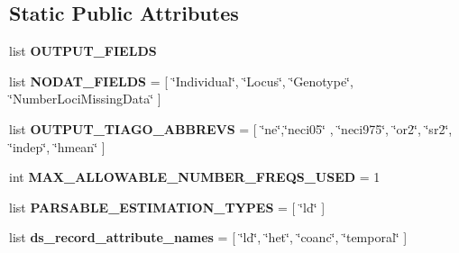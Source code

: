 \subsection*{Static Public Attributes}
\begin{DoxyCompactItemize}
\item 
list {\bfseries O\+U\+T\+P\+U\+T\+\_\+\+F\+I\+E\+L\+DS}
\item 
list {\bfseries N\+O\+D\+A\+T\+\_\+\+F\+I\+E\+L\+DS} = \mbox{[} \char`\"{}Individual\char`\"{}, \char`\"{}Locus\char`\"{}, \char`\"{}Genotype\char`\"{}, \char`\"{}Number\+Loci\+Missing\+Data\char`\"{} \mbox{]}\hypertarget{classnegui_1_1pgoutputneestimator_1_1PGOutputNeEstimator_a4e5c6c9926a8f963e36d83d858366c4d}{}\label{classnegui_1_1pgoutputneestimator_1_1PGOutputNeEstimator_a4e5c6c9926a8f963e36d83d858366c4d}

\item 
list {\bfseries O\+U\+T\+P\+U\+T\+\_\+\+T\+I\+A\+G\+O\+\_\+\+A\+B\+B\+R\+E\+VS} = \mbox{[} \char`\"{}ne\char`\"{},\char`\"{}neci05\char`\"{} , \char`\"{}neci975\char`\"{}, \char`\"{}or2\char`\"{}, \char`\"{}sr2\char`\"{}, \char`\"{}indep\char`\"{}, \char`\"{}hmean\char`\"{} \mbox{]}\hypertarget{classnegui_1_1pgoutputneestimator_1_1PGOutputNeEstimator_a916a47666e6360ea279b944832907b27}{}\label{classnegui_1_1pgoutputneestimator_1_1PGOutputNeEstimator_a916a47666e6360ea279b944832907b27}

\item 
int {\bfseries M\+A\+X\+\_\+\+A\+L\+L\+O\+W\+A\+B\+L\+E\+\_\+\+N\+U\+M\+B\+E\+R\+\_\+\+F\+R\+E\+Q\+S\+\_\+\+U\+S\+ED} = 1\hypertarget{classnegui_1_1pgoutputneestimator_1_1PGOutputNeEstimator_ab5bcb8ce89a3453910014169865706d2}{}\label{classnegui_1_1pgoutputneestimator_1_1PGOutputNeEstimator_ab5bcb8ce89a3453910014169865706d2}

\item 
list {\bfseries P\+A\+R\+S\+A\+B\+L\+E\+\_\+\+E\+S\+T\+I\+M\+A\+T\+I\+O\+N\+\_\+\+T\+Y\+P\+ES} = \mbox{[} \char`\"{}ld\char`\"{} \mbox{]}\hypertarget{classnegui_1_1pgoutputneestimator_1_1PGOutputNeEstimator_a004e7b99039d5176bff002232337d4e3}{}\label{classnegui_1_1pgoutputneestimator_1_1PGOutputNeEstimator_a004e7b99039d5176bff002232337d4e3}

\item 
list {\bfseries ds\+\_\+record\+\_\+attribute\+\_\+names} = \mbox{[} \char`\"{}ld\char`\"{}, \char`\"{}het\char`\"{}, \char`\"{}coanc\char`\"{}, \char`\"{}temporal\char`\"{} \mbox{]}\hypertarget{classnegui_1_1pgoutputneestimator_1_1PGOutputNeEstimator_ac84ab852eaf88c7bebdb5030bb825e7a}{}\label{classnegui_1_1pgoutputneestimator_1_1PGOutputNeEstimator_ac84ab852eaf88c7bebdb5030bb825e7a}


\end{DoxyCompactItemize}
